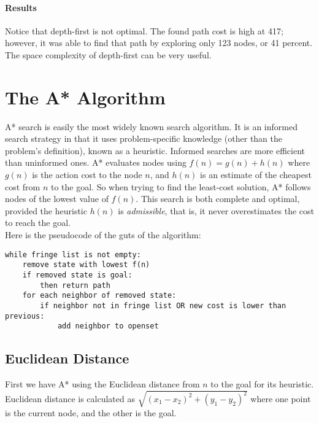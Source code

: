 \documentclass[12pt, article]{scrartcl}
\begin{document}
\paragraph{Results}
Notice that depth-first is not optimal. The found path cost is high at 417; however, it was able to find that path by exploring only 123 nodes, or 41 percent. The space complexity of depth-first can be very useful. \\

\section{The A* Algorithm}
A* search is easily the most widely known search algorithm. It is an informed search strategy in that it uses problem-specific knowledge (other than the problem's definition), known as a heuristic. Informed searches are more efficient than uninformed ones. A* evaluates nodes using $f(n) = g(n) + h(n)$ where $g(n)$ is the action cost to the node $n$, and $h(n)$ is an estimate of the cheapest cost from $n$ to the goal. So when trying to find the least-cost solution, A* follows nodes of the lowest value of $f(n)$. This search is both complete and optimal, provided the heuristic $h(n)$ is \emph{admissible}, that is, it never overestimates the cost to reach the goal. \\

Here is the pseudocode of the guts of the algorithm:
\begin{verbatim}
while fringe list is not empty:
    remove state with lowest f(n)
    if removed state is goal:
        then return path
    for each neighbor of removed state:
        if neighbor not in fringe list OR new cost is lower than previous:
            add neighbor to openset
\end{verbatim}

\subsection{Euclidean Distance}
First we have A* using the Euclidean distance from $n$ to the goal for its heuristic. Euclidean distance is calculated as $\sqrt{(x_1-x_2)^2 + (y_1-y_2)^2}$ where one point is the current node, and the other is the goal.\\ \\
\end{document}
